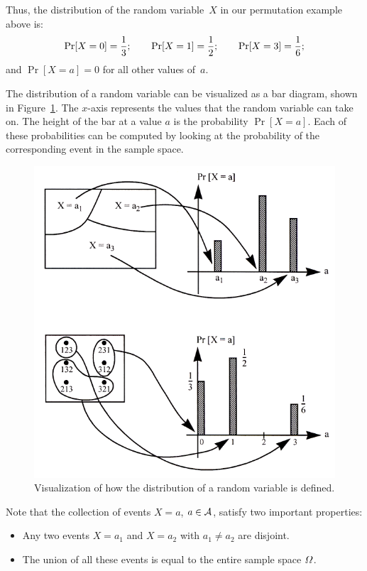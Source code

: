 \documentclass[11pt]{article}
\def\Omega{\mathchar"10A }
\def\Omega{\mathchar"10A }
\def\Aset{{\cal A}}
\begin{document}
Thus, the distribution of the random variable~$X$ in our permutation
example above is:
$$\Pr[X=0]={1\over 3};\qquad\Pr[X=1]={1\over 2};\qquad\Pr[X=3]={1\over 6}; $$
and $\Pr[X=a]=0$ for all other values of~$a$.

The distribution of a random variable can be visualized as a  bar diagram,  shown in Figure~\ref{fig:dist}. The $x$-axis represents the values that the random variable can take on. The  height of the bar at a value $a$ is the probability $\Pr[X=a]$. Each of these probabilities can be computed by looking at the probability of the corresponding event in the sample space.

\begin{figure}[h!]
\centering
\includegraphics{distribution}
\caption{Visualization of how the distribution of a random variable is defined.}
\label{fig:dist}
\end{figure}


\pagebreak
Note that the collection of events $X=a$, $a \in \Aset$,  satisfy two important properties:
\begin{itemize}
\item Any two events $X=a_1$ and $X= a_2$ with $a_1 \not = a_2$ are disjoint.
\item The union of all these events is equal to the entire sample space $\Omega$.
\end{itemize}
\end{document}
